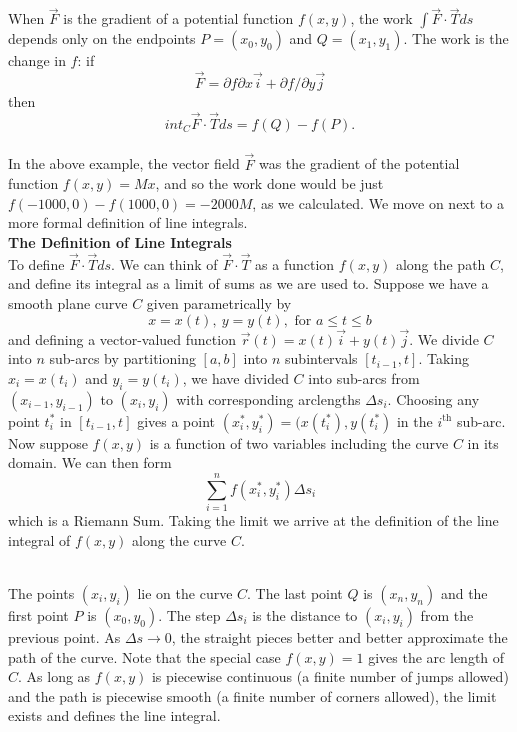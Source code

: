 {
When $\vec F$ is the gradient of a potential function $f(x, y)$, the work $\int \vec F \cdot \vec T ds$ depends only on the endpoints $P = (x_0,y_0)$ and $Q = (x_1,y_1)$. The work is the change in $f$: if
$$\vec F = \partial f \partial x \vec i + \partial f/\partial y \vec j$$
then
$$int_C \vec F \cdot \vec T ds = f(Q) - f(P).$$
}\\

In the above example, the vector field $\vec F$ was the gradient of the potential function $f(x,y) = Mx$, and so the work done would be just $f(-1000,0) - f(1000,0) = -2000M$, as we calculated.  We move on next to a more formal definition of line integrals. \\




\noindent\textbf{\large The Definition of Line Integrals}\\

To define $\vec F \cdot \vec T ds$. We can think of $\vec F \cdot \vec T$ as a function $f(x, y)$
along the path $C$, and define its integral as a limit of sums as we are used to. Suppose we have a smooth plane curve $C$ given parametrically by
$$x = x(t), \: y = y(t), \text{ for } a \leq t \leq b$$
and defining a vector-valued function $\vec r (t) = x(t) \vec i + y(t) \vec j$.  We divide $C$ into $n$ sub-arcs by partitioning $[a,b]$ into $n$ subintervals $[t_{i-1},t]$. Taking $x_i = x(t_i)$ and $y_i = y(t_i)$, we have divided $C$ into sub-arcs from $(x_{i-1},y_{i-1})$ to $(x_i,y_i)$ with corresponding arclengths $\Delta s_i$.  Choosing any point $t_i^{\ast}$ in $[t_{i-1},t]$ gives a point $(x_i^{\ast},y_i^{\ast}) = (x(t_i^{\ast}), y(t_i^{\ast})$ in the $i^{\text{th}}$ sub-arc.\\

Now suppose $f(x,y)$ is a function of two variables including the curve $C$ in its domain.  We can then form
$$\sum_{i=1}^{n} f(x_i^{\ast},y_i^{\ast}) \Delta s_i$$
which is a Riemann Sum.  Taking the limit we arrive at the definition of the line integral of $f(x,y)$ along the curve $C$.


\\


The points $(x_i, y_i)$ lie on the curve $C$. The last point $Q$ is $(x_n, y_n)$ and the first point $P$ is $(x_0, y_0)$. The step $\Delta s_i$ is the distance to $(x_i, y_i)$ from the previous point. As $\Delta s \to 0$, the straight pieces better and better approximate the path of the curve. Note that the special case $f(x,y) = 1$ gives the arc length of $C$. As long as $f(x, y)$ is piecewise continuous (a finite number of jumps allowed) and the path is piecewise smooth (a finite number of corners allowed), the limit exists and defines the line integral.\\

